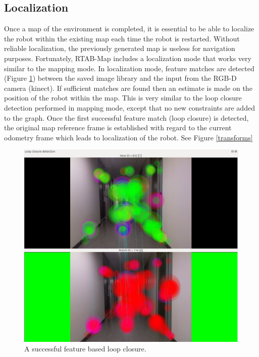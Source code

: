 \documentclass[letterpaper, 10 pt, conference]{ieeeconf}  %
\begin{document}
\subsection{Localization}

Once a map of the environment is completed, it is essential to be able to localize the robot within the existing map each time the robot is restarted. Without reliable localization, the previously generated map is useless for navigation purposes. Fortunately, RTAB-Map includes a localization mode that works very similar to the mapping mode. In localization mode, feature matches are detected (Figure \ref{localization}) between the saved image library and the input from the RGB-D camera (kinect). If sufficient matches are found then an estimate is made on the position of the robot within the map. This is very similar to the loop closure detection performed in mapping mode, except that no new constraints are added to the graph. Once the first successful feature match (loop closure) is detected, the original map reference frame is established with regard to the current odometry frame which leads to localization of the robot. See Figure \ref{transforms}

	\begin{figure}[!ht]
		\centering
		\includegraphics[width=1.0\columnwidth]{Figures/loop_closure}
		\caption{A successful feature based loop closure.}
		\label{localization}
	\end{figure}
\end{document}
